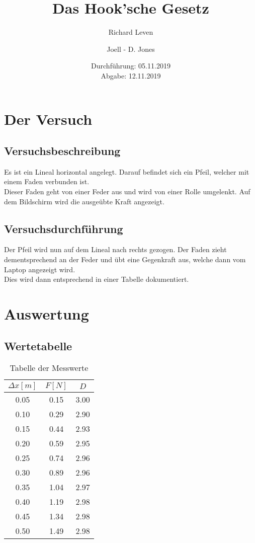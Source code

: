 \documentclass[captions=tableheading]{scrartcl}
\title{Das Hook'sche Gesetz}
\author{Richard Leven \and Joell - D. Jones}
\date{
    Durchführung: 05.11.2019\\
    Abgabe: 12.11.2019
}
\begin{document}
\maketitle
\section{Der Versuch}
\subsection{Versuchsbeschreibung}
Es ist ein Lineal horizontal angelegt. Darauf befindet sich ein Pfeil, welcher mit einem Faden verbunden ist.\\ Dieser Faden geht von einer Feder aus und wird von einer Rolle umgelenkt. Auf dem Bildschirm wird die ausgeübte Kraft angezeigt.

\subsection{Versuchsdurchführung}

Der Pfeil wird nun auf dem Lineal nach rechts gezogen. Der Faden zieht dementsprechend an der Feder und übt eine Gegenkraft aus, welche dann vom Laptop angezeigt wird.\\ Dies wird dann entsprechend in einer Tabelle dokumentiert.

\newpage
\section{Auswertung}
\subsection{Wertetabelle}
    
    \begin{table}[htp]
        \centering
        \caption{Tabelle der Messwerte}
        \label{tab:some_data}
        \begin{tabular}{c c c}
            \toprule
            $\Delta x [m]$ & $F [N]$ & $D$\\
            \midrule
            0.05 & 0.15 & 3.00 \\
            0.10 & 0.29 & 2.90 \\
            0.15 & 0.44 & 2.93 \\
            0.20 & 0.59 & 2.95 \\
            0.25 & 0.74 & 2.96 \\
            0.30 & 0.89 & 2.96 \\
            0.35 & 1.04 & 2.97 \\
            0.40 & 1.19 & 2.98 \\
            0.45 & 1.34 & 2.98 \\
            0.50 & 1.49 & 2.98 \\
            \bottomrule
        \end{tabular}
    \end{table}
\end{document}
